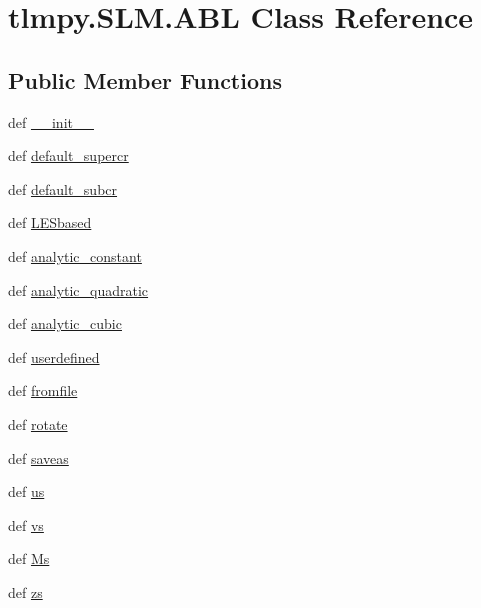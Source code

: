 \hypertarget{classtlmpy_1_1SLM_1_1ABL}{
\section{tlmpy.SLM.ABL Class Reference}
\label{classtlmpy_1_1SLM_1_1ABL}
}
\subsection*{Public Member Functions}
\begin{DoxyCompactItemize}
\item 
def \hyperlink{classtlmpy_1_1SLM_1_1ABL_a3a6799e28f871a0acfc1adcbf3f47e26}{\_\-\_\-init\_\-\_\-}
\item 
def \hyperlink{classtlmpy_1_1SLM_1_1ABL_ac1c1c0e6ba67564475b945adfa33f870}{default\_\-supercr}
\item 
def \hyperlink{classtlmpy_1_1SLM_1_1ABL_a6f12d883cddd9eeb9df0d21b71ebaca9}{default\_\-subcr}
\item 
def \hyperlink{classtlmpy_1_1SLM_1_1ABL_a77e5c46b2b5eac7b1ea0c14fe06e4145}{LESbased}
\item 
def \hyperlink{classtlmpy_1_1SLM_1_1ABL_af054609ff5ff944585272a7b42ed7f83}{analytic\_\-constant}
\item 
def \hyperlink{classtlmpy_1_1SLM_1_1ABL_aeb53c834998feef39584056aaf825d45}{analytic\_\-quadratic}
\item 
def \hyperlink{classtlmpy_1_1SLM_1_1ABL_a9d2b072be9668fed2a068258b3d3e2c9}{analytic\_\-cubic}
\item 
def \hyperlink{classtlmpy_1_1SLM_1_1ABL_ac60535ffc09e0bb3c4c0f322fc897362}{userdefined}
\item 
def \hyperlink{classtlmpy_1_1SLM_1_1ABL_ac5941b9a426be1c1c410966486d26625}{fromfile}
\item 
def \hyperlink{classtlmpy_1_1SLM_1_1ABL_a57ccba54f0284a1a6e1335bb7b341e80}{rotate}
\item 
def \hyperlink{classtlmpy_1_1SLM_1_1ABL_a242724d516ea41ddec6c86fe11ab985d}{saveas}
\item 
def \hyperlink{classtlmpy_1_1SLM_1_1ABL_ae58d7d35afb4d3ef97905bcaf73a728c}{us}
\item 
def \hyperlink{classtlmpy_1_1SLM_1_1ABL_ac05126b4ccb1d2882bd3ba8a80045bf5}{vs}
\item 
def \hyperlink{classtlmpy_1_1SLM_1_1ABL_af125d406825aaab9e870e5550ff33319}{Ms}
\item 
def \hyperlink{classtlmpy_1_1SLM_1_1ABL_a0913ecb90c46cbfc457c307600af6a7b}{zs}

\end{DoxyCompactItemize}
